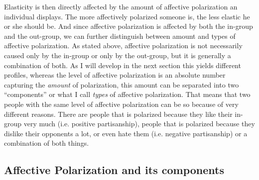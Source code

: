 \documentclass[a4paper, svgnames]{article}
\begin{document}
Elasticity is then directly affected by the amount of affective polarization an individual displays. The more affectively polarized someone is, the less elastic he or she should be. And since affective polarization is affected by both the in-group and the out-group, we can further distinguish between amount and types of affective polarization. As stated above, affective polarization is not necessarily caused only by the in-group or only by the out-group, but it is generally a combination of both. As I will develop in the next section this yields different profiles, whereas the level of affective polarization is an absolute number capturing the \textit{amount} of polarization, this amount can be separated into two ``components'' or what I call \textit{types} of affective polarization. That means that two people with the same level of affective polarization can be so because of very different reasons. There are people that is polarized because they like their in-group very much (i.e. positive partisanship), people that is polarized because they dislike their opponents a lot, or even hate them (i.e.  negative partisanship) or a combination of both things.

\subsection{Affective Polarization and its components}
\label{theoretical-proposal}
\end{document}
